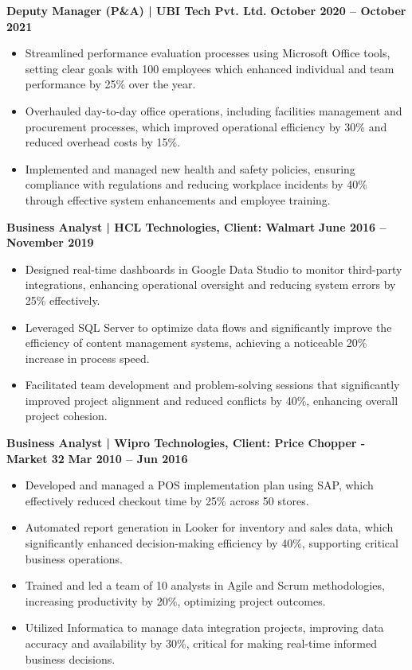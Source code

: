 \documentclass{article}
\begin{document}
\noindent \textbf{Deputy Manager (P\&A) | UBI Tech Pvt. Ltd.} \hfill \textbf{October 2020 – October 2021}
\begin{itemize}[noitemsep,nolistsep,leftmargin=*]
\item {\small Streamlined performance evaluation processes using Microsoft Office tools, setting clear goals with 100 employees which enhanced individual and team performance by 25\% over the year.}
\item {\small Overhauled day-to-day office operations, including facilities management and procurement processes, which improved operational efficiency by 30\% and reduced overhead costs by 15\%.}
\item {\small Implemented and managed new health and safety policies, ensuring compliance with regulations and reducing workplace incidents by 40\% through effective system enhancements and employee training.}
\end{itemize}

\noindent \textbf{Business Analyst | HCL Technologies, Client: Walmart} \hfill \textbf{June 2016 – November 2019}
\begin{itemize}[noitemsep,nolistsep,leftmargin=*]
\item {\small Designed real-time dashboards in Google Data Studio to monitor third-party integrations, enhancing operational oversight and reducing system errors by 25\% effectively.}
\item {\small Leveraged SQL Server to optimize data flows and significantly improve the efficiency of content management systems, achieving a noticeable 20\% increase in process speed.}
\item {\small Facilitated team development and problem-solving sessions that significantly improved project alignment and reduced conflicts by 40\%, enhancing overall project cohesion.}
\end{itemize}
\vspace{1mm}

\noindent \textbf{Business Analyst | Wipro Technologies, Client: Price Chopper - Market 32} \hfill \textbf{Mar 2010 – Jun 2016}
\begin{itemize}[noitemsep,nolistsep,leftmargin=*]
\item {\small Developed and managed a POS implementation plan using SAP, which effectively reduced checkout time by 25\% across 50 stores.}
\item {\small Automated report generation in Looker for inventory and sales data, which significantly enhanced decision-making efficiency by 40\%, supporting critical business operations.}
\item {\small Trained and led a team of 10 analysts in Agile and Scrum methodologies, increasing productivity by 20\%, optimizing project outcomes.}
\item {\small Utilized Informatica to manage data integration projects, improving data accuracy and availability by 30\%, critical for making real-time informed business decisions.}
\end{itemize}
\end{document}
